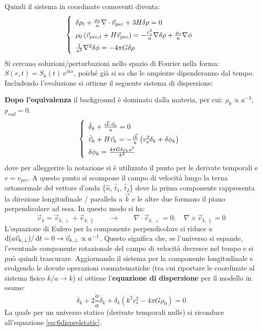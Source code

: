 Quindi il sistema in coordinate comoventi diventa:
\begin{equation}\left\{
    \def\arraystretch{1.5}
    \begin{array}{l}
        \delta\rho_t + \frac{\rho_0}{a} \nabla \cdot\vec{v}_{pec} + 3H \delta\rho =0 \\
        \rho_0 \left ( \vec{v}_{pec, t} + H \vec{v}_{pec} \right) = -\frac{c_s^2}{a} \nabla\delta\rho +\frac{\rho_0}{a}\nabla\phi \\
        \frac{1}{a^2}\nabla^2 \delta \phi = -4\pi G \delta\rho 
    \end{array}\right.
\end{equation}
Si  cercano  soluzioni/perturbazioni  nello  spazio  di Fourier nella forma: $S(r,t) =S_k (t)\: e^{ikx}$, poiché già si sa che le ampiezze dipenderanno dal tempo. Includendo l'evoluzione  si ottiene il seguente sistema di dispersione: 

\textbf{Dopo l'equivalenza} il background è dominato dalla materia, per cui: $\rho_0 \propto a^{-3}$, $p_{rad}=0$.
\begin{equation}\left\{
    \def\arraystretch{1.5}
    \begin{array}{l}
        \dot{\delta}_{k} + \frac{i\vec{k}\cdot\vec{v}_k}{a}=0 \\
        \dot{\vec{v}}_k + H \vec{v}_k = -\frac{i\vec{k}}{a}\left( v_s^2 \delta_k + \delta\phi_k\right) \\
        \delta\phi_k = \frac{4 \pi G \delta \rho_k a^2}{k^2}
    \end{array}\right.
\end{equation}
dove per alleggerire la notazione si è utilizzato il punto per le derivate temporali e $v=v_{pec}$. A questo punto si scompone il campo di velocità lungo la terna ortonormale del vettore d'onda \{$\hat{n}$, $\hat{t}_1$, $\hat{t}_2$\} dove la prima componente rappresenta la direzione longitudinale / parallela a $\vec{k}$ e le altre due formano il piano perpendicolare ad essa. In questo modo si ha:
$$
\vec{v}_k = \vec{v}_{k,\perp} + \vec{v}_{k,\parallel} \qquad \rightarrow \qquad \nabla \cdot \vec{v}_{k,\perp} = 0; \quad \nabla \times  \vec{v}_{k,\parallel} =0
$$
L'equazione di Eulero per la componente perpendicolare si riduce a $\operatorname{d}\!{( a\vec{v}_{k,\perp})}/\operatorname{d}\!{t}=0 \rightarrow \vec{v}_{k,\perp}\propto a^{-1}$. Questo significa che, se l'universo si espande, l'eventuale componente rotazionale del campo di velocità decresce nel tempo e si può quindi trascurare.
Aggiornando il sistema per la componente longitudinale e svolgendo le dovute operazioni cosmatematiche (tra cui riportare le coordinate al sistema fisico $k/a\rightarrow k$) si ottiene l'\textbf{equazione di dispersione} per il modello in esame:
\begin{equation}
    \ddot{\delta}_k + 2 \frac{\dot{a}}{a}\dot{\delta}_k + \delta_k \left( k^2 c_s^2 -4\pi G \rho_0\right) =0 \label{eq:6disprelmat}
\end{equation}
La quale per un universo statico (derivate temporali nulle) si riconduce all'equazione \ref{eq:6disprelstatic}.

